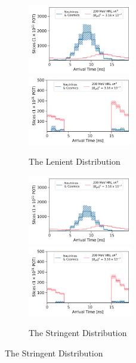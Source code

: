 \begin{figure}[htbp!]
        \begin{subfigure}[b]{1.0\textwidth}
            \includegraphics[width=0.5\textwidth]{relaxed_cut}
            \includegraphics[width=0.5\textwidth]{relaxed_cut_edge}
            \caption{The Lenient Distribution}%
	    \label{fig:final_relaxed}
     	    \vspace{0.5cm}
        \end{subfigure}
        \begin{subfigure}[b]{1.0\textwidth}
            \includegraphics[width=0.5\textwidth]{strict_cut}
            \includegraphics[width=0.5\textwidth]{strict_cut_edge}
            \caption{The Stringent Distribution}%
	    \label{fig:final_strict}

\end{subfigure}
\end{figure}
